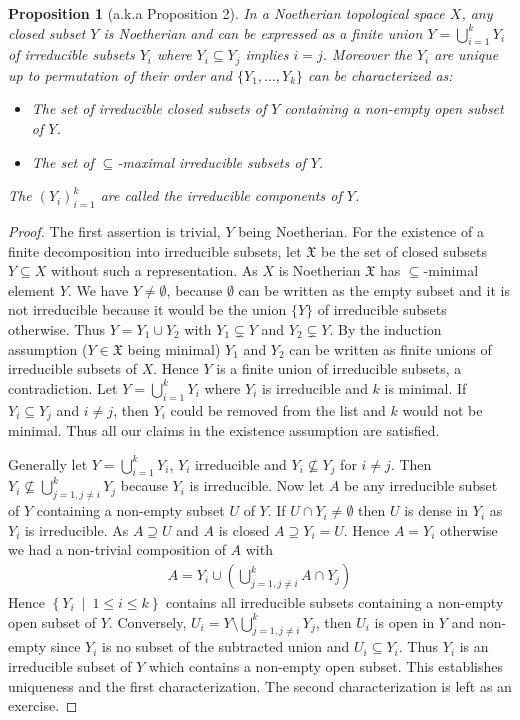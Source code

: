 \documentclass[DIV=14,parskip=full,pointednumbers]{scrartcl}
\theoremstyle{cthm}
\newtheorem{prop}{Proposition}[subsection]
\theoremstyle{cdef}
\newcommand{\XX}{\mathfrak{X}}
\newcommand{\st}{\ \middle|\ }
\begin{document}
\begin{prop}[a.k.a Proposition 2]
 In a Noetherian topological space $X$, any closed subset $Y$ is Noetherian and can be expressed as a finite union $Y= \bigcup_{i=1}^k Y_i$ of irreducible subsets $Y_i$ where $Y_i\subseteq Y_j$ implies $i=j$. Moreover the $Y_i$ are unique up to permutation of their order and $\{Y_1,\ldots, Y_k\}$ can be characterized as:
 \begin{itemize}
  \item The set of irreducible closed subsets of $Y$ containing a non-empty open subset of $Y$.
  \item The set of $\subseteq$-maximal irreducible subsets of $Y$.
 \end{itemize}
The $(Y_i)_{i=1}^k$ are called the \emph{irreducible components} of $Y$.
\end{prop}
\begin{proof}
 The first assertion is trivial, $Y$ being Noetherian. For the existence of a finite decomposition into irreducible subsets, let $\XX$ be the set of closed subsets $Y\subseteq X$ without such a representation. As $X$ is Noetherian $\XX$ has $\subseteq $-minimal element $Y$. We have $Y\neq \emptyset$, because $\emptyset$ can be written as the empty subset and it is not irreducible because it would be the union $\{Y\}$ of irreducible subsets otherwise. Thus $Y= Y_1\cup Y_2$ with $Y_1\subsetneq Y$ and $Y_2\subsetneq Y$. By the induction assumption ($Y\in \XX$ being minimal) $Y_1$ and $Y_2$ can be written as finite unions of irreducible subsets of $X$. Hence $Y$ is a finite union of irreducible subsets, a contradiction. Let $Y=\bigcup_{i=1}^k Y_i$ where $Y_i$ is irreducible and $k$ is minimal. If $Y_i\subseteq Y_j$ and $i\neq j$, then $Y_i$ could be removed from the list and $k$ would not be minimal. Thus all our claims in the existence assumption are satisfied.
 
 Generally let $Y=\bigcup_{i=1}^kY_i$, $Y_i$ irreducible and $Y_i\not\subseteq Y_j$ for $i\neq j$. Then $Y_i\not\subseteq \bigcup_{j=1, j\neq i}^k Y_j$ because $Y_i$ is irreducible. Now let $A$ be any irreducible subset of $Y$ containing a non-empty subset $U$ of $Y$. If $U\cap Y_i\neq \emptyset$ then $U$ is dense in $Y_i$ as $Y_i$ is irreducible. As $A\supseteq U$ and $A$ is closed $A\supseteq Y_i = U$. Hence $A=Y_i$ otherwise we had a non-trivial composition of $A$ with 
 \begin{align*}
  A= Y_i \cup \left(\bigcup_{j=1, j\neq i}^k A\cap Y_j\right)
 \end{align*}
Hence $\left\{ Y_i\st 1\leq i \leq k\right\}$ contains all irreducible subsets containing a non-empty open subset of $Y$. Conversely, $U_i = Y\setminus \bigcup_{j=1, j\neq i}^k Y_j$, then $U_i$ is open in $Y$ and non-empty since $Y_i$ is no subset of the subtracted union and $U_i\subseteq Y_i$. Thus $Y_i$ is an irreducible subset of $Y$ which contains a non-empty open subset. This establishes uniqueness and the first characterization. The second characterization is left as an exercise.
\end{proof}
\end{document}
